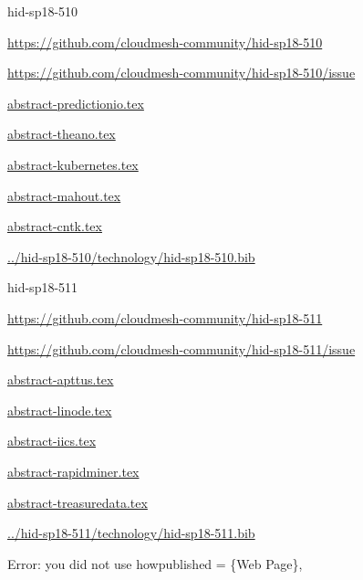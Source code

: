 \begin{IU}

hid-sp18-510

\url{https://github.com/cloudmesh-community/hid-sp18-510}

\url{https://github.com/cloudmesh-community/hid-sp18-510/issue}

\href{https://github.com/cloudmesh-community/hid-sp18-510/blob/master//technology/abstract-predictionio.tex}{abstract-predictionio.tex}

\href{https://github.com/cloudmesh-community/hid-sp18-510/blob/master//technology/abstract-theano.tex}{abstract-theano.tex}

\href{https://github.com/cloudmesh-community/hid-sp18-510/blob/master//technology/abstract-kubernetes.tex}{abstract-kubernetes.tex}

\href{https://github.com/cloudmesh-community/hid-sp18-510/blob/master//technology/abstract-mahout.tex}{abstract-mahout.tex}

\href{https://github.com/cloudmesh-community/hid-sp18-510/blob/master//technology/abstract-cntk.tex}{abstract-cntk.tex}

\href{https://github.com/cloudmesh-community/hid-sp18-510/blob/master//technology/hid-sp18-510.bib}{../hid-sp18-510/technology/hid-sp18-510.bib}

\end{IU}


\begin{IU}

hid-sp18-511

\url{https://github.com/cloudmesh-community/hid-sp18-511}

\url{https://github.com/cloudmesh-community/hid-sp18-511/issue}

\href{https://github.com/cloudmesh-community/hid-sp18-511/blob/master//technology/abstract-apttus.tex}{abstract-apttus.tex}

\href{https://github.com/cloudmesh-community/hid-sp18-511/blob/master//technology/abstract-linode.tex}{abstract-linode.tex}

\href{https://github.com/cloudmesh-community/hid-sp18-511/blob/master//technology/abstract-iics.tex}{abstract-iics.tex}

\href{https://github.com/cloudmesh-community/hid-sp18-511/blob/master//technology/abstract-rapidminer.tex}{abstract-rapidminer.tex}

\href{https://github.com/cloudmesh-community/hid-sp18-511/blob/master//technology/abstract-treasuredata.tex}{abstract-treasuredata.tex}

\href{https://github.com/cloudmesh-community/hid-sp18-511/blob/master//technology/hid-sp18-511.bib}{../hid-sp18-511/technology/hid-sp18-511.bib}

Error: you did not use howpublished = \{Web Page\},

\end{IU}



